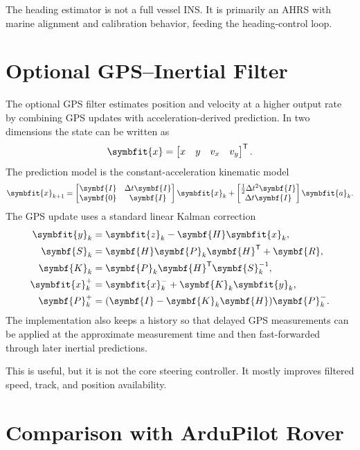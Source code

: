 \documentclass[10pt,twocolumn]{article}
\newcommand{\vct}[1]{\symbfit{#1}}   %
\newcommand{\mat}[1]{\symbf{#1}}     %
\newcommand{\T}{^{\mathsf{T}}}
\newcommand{\inv}{^{-1}}
\begin{document}
The heading estimator is not a full vessel INS.  It is primarily an AHRS with marine
alignment and calibration behavior, feeding the heading-control loop.

\section{Optional GPS--Inertial Filter}

The optional GPS filter estimates position and velocity at a higher output rate by
combining GPS updates with acceleration-derived prediction.  In two dimensions the state
can be written as
\begin{equation}
  \vct{x} = \begin{bmatrix} x & y & v_x & v_y \end{bmatrix}\T .
\end{equation}
The prediction model is the constant-acceleration kinematic model
\begin{equation}
  \vct{x}_{k+1} =
  \begin{bmatrix}
  \mat{I} & \Delta t\mat{I} \\
  \mat{0} & \mat{I}
  \end{bmatrix}\vct{x}_k
  +
  \begin{bmatrix}
  \frac{1}{2}\Delta t^2\mat{I} \\
  \Delta t\mat{I}
  \end{bmatrix}\vct{a}_k.
  \label{eq:gps-predict}
\end{equation}
The GPS update uses a standard linear Kalman correction
\begin{align}
  \vct{y}_k &= \vct{z}_k - \mat{H}\vct{x}_k, \\
  \mat{S}_k &= \mat{H}\mat{P}_k\mat{H}\T + \mat{R}, \\
  \mat{K}_k &= \mat{P}_k\mat{H}\T\mat{S}_k\inv, \\
  \vct{x}_k^+ &= \vct{x}_k^- + \mat{K}_k\vct{y}_k, \\
  \mat{P}_k^+ &= (\mat{I}-\mat{K}_k\mat{H})\mat{P}_k^-.
\end{align}
The implementation also keeps a history so that delayed GPS measurements can be applied
at the approximate measurement time and then fast-forwarded through later inertial
predictions.

This is useful, but it is not the core steering controller.  It mostly improves filtered
speed, track, and position availability.

\section{Comparison with ArduPilot Rover}
\end{document}

